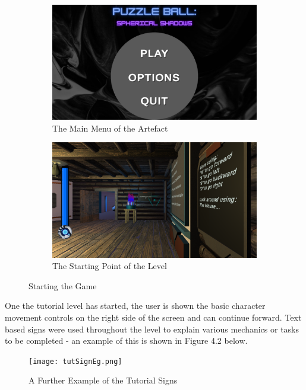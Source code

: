 \begin{figure}[H]
\centering
\begin{subfigure}{0.5\textwidth}
  \centering
  \includegraphics[width=1\linewidth]{Figures/menu.png}
  \caption{The Main Menu of the Artefact}
\end{subfigure}%
\begin{subfigure}{0.5\textwidth}
  \centering
  \includegraphics[width=1\linewidth]{Figures/start.png}
  \caption{The Starting Point of the Level}
\end{subfigure}
\caption{Starting the Game}
\end{figure}

\noindent One the tutorial level has started, the user is shown the basic character movement controls on the right side of the screen and can continue forward. Text based signs were used throughout the level to explain various mechanics or tasks to be completed - an example of this is shown in Figure 4.2 below.

\begin{figure}[H]
\centering
\centerline{\texttt{[image: tutSignEg.png]}}
\caption{A Further Example of the Tutorial Signs}
\end{figure}

